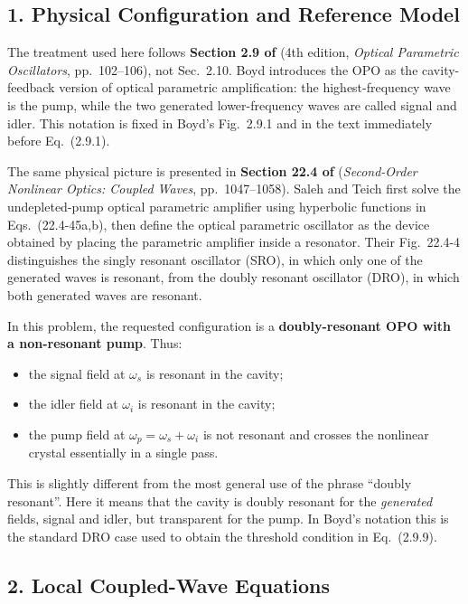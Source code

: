 \begin{resolucao}[Solution]

\subsection*{1. Physical Configuration and Reference Model}

The treatment used here follows \textbf{Section 2.9 of } (4th edition, \textit{Optical Parametric Oscillators}, pp.~102--106), not Sec.~2.10. Boyd introduces the OPO as the cavity-feedback version of optical parametric amplification: the highest-frequency wave is the pump, while the two generated lower-frequency waves are called signal and idler. This notation is fixed in Boyd's Fig.~2.9.1 and in the text immediately before Eq.~(2.9.1).

The same physical picture is presented in \textbf{Section 22.4 of } (\textit{Second-Order Nonlinear Optics: Coupled Waves}, pp.~1047--1058). Saleh and Teich first solve the undepleted-pump optical parametric amplifier using hyperbolic functions in Eqs.~(22.4-45a,b), then define the optical parametric oscillator as the device obtained by placing the parametric amplifier inside a resonator. Their Fig.~22.4-4 distinguishes the singly resonant oscillator (SRO), in which only one of the generated waves is resonant, from the doubly resonant oscillator (DRO), in which both generated waves are resonant.

In this problem, the requested configuration is a \textbf{doubly-resonant OPO with a non-resonant pump}. Thus:
\begin{itemize}
    \item the signal field at $\omega_s$ is resonant in the cavity;
    \item the idler field at $\omega_i$ is resonant in the cavity;
    \item the pump field at $\omega_p=\omega_s+\omega_i$ is not resonant and crosses the nonlinear crystal essentially in a single pass.
\end{itemize}

This is slightly different from the most general use of the phrase ``doubly resonant''. Here it means that the cavity is doubly resonant for the \emph{generated} fields, signal and idler, but transparent for the pump. In Boyd's notation this is the standard DRO case used to obtain the threshold condition in Eq.~(2.9.9).

\subsection*{2. Local Coupled-Wave Equations}


\end{resolucao}
